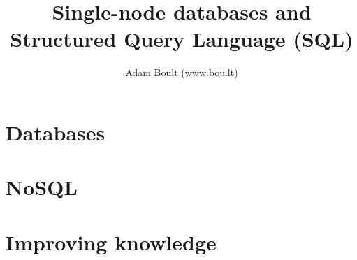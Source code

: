 \documentclass[oneside]{book}
\begin{document}
\author{Adam Boult (www.bou.lt)}
\title{Single-node databases and Structured Query Language (SQL)}
\maketitle

\setcounter{tocdepth}{0}
\tableofcontents



\part{Databases}




\part{NoSQL}


\part{Improving knowledge}


\end{document}

